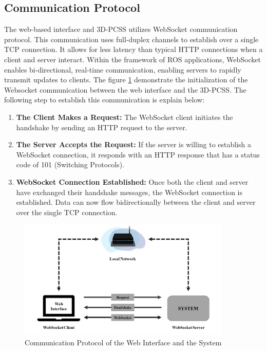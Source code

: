 \subsection{Communication Protocol}
The web-based interface and 3D-PCSS utilizes WebSocket communication protocol. This communication uses full-duplex channels to establish over a single TCP connection. It allows for less latency than typical HTTP connections when a client and server interact. Within the framework of ROS applications, WebSocket enables bi-directional, real-time communication, enabling servers to rapidly transmit updates to clients. The figure \ref{ch3:fig:websocket-connection} demonstrate the initialization of the Websocket communication between the web interface and the 3D-PCSS. The following step to establish this communication is explain below:

\begin{enumerate}
	\item \textbf{The Client Makes a Request:} The WebSocket client initiates the handshake by sending an HTTP request to the server.
	\item \textbf{The Server Accepts the Request:} If the server is willing to establish a WebSocket connection, it responds with an HTTP response that has a status code of 101 (Switching Protocols).
	\item \textbf{WebSocket Connection Established:} Once both the client and server have exchanged their handshake messages, the WebSocket connection is established. Data can now flow bidirectionally between the client and server over the single TCP connection.
\end{enumerate}

\begin{figure}[H]
	\centering
	\includegraphics[width=0.9\textwidth]{Figures/websocket-connection}
	\caption{Communication Protocol of the Web Interface and the System}
	\label{ch3:fig:websocket-connection}
\end{figure}

